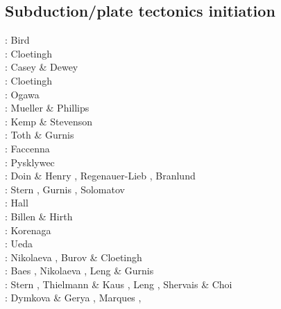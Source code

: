 \subsection{Subduction/plate tectonics initiation}

\begin{scriptsize}
\nineteenseventyeight: Bird \cite{bird78}\\
\nineteeneightytwo: Cloetingh \cite{clwv82}\\
\nineteeneightyfour: Casey \& Dewey \cite{cade84}\\
\nineteeneightynine: Cloetingh \etal \cite{clwv89}\\
\nineteenninety: Ogawa \cite{ogaw90} \\
\nineteenninetyone: Mueller \& Phillips \cite{muph91}\\
\nineteenninetysix: Kemp \& Stevenson \cite{kest96}\\
\nineteenninetyeight: Toth \& Gurnis \cite{togu98}\\
\nineteenninetynine: Faccenna \etal \cite{fagd99}\\
\twothousand: Pysklywec \etal \cite{pybf00}\\
\twothousandone: Doin \& Henry \cite{dohe01}, Regenauer-Lieb \etal \cite{reyb01},
                 Branlund \etal \cite{brry01}\\
\twothousandfour: Stern \cite{ster04}, Gurnis \etal \cite{guhl04}, 
                  Solomatov \cite{solo04}\\
\twothousandthree: Hall \etal \cite{hags03}\\
\twothousandfive: Billen \& Hirth \cite{bihi05}\\
\twothousandseven: Korenaga \cite{kore07}\\
\twothousandeight: Ueda \etal \cite{uegs08}\\
\twothousandten: Nikolaeva \etal \cite{nigm10}, Burov \& Cloetingh \cite{bucl10}\\
\twothousandeleven: Baes \etal \cite{bagw11}, Nikolaeva \etal \cite{nigm11}, 
                    Leng \& Gurnis \cite{legu11}\\
\twothousandtwelve: Stern \etal \cite{stri12}, Thielmann \& Kaus \cite{thka12},
                    Leng \etal \cite{lega12}, Shervais \& Choi \cite{shch12}\\
\twothousandthirteen: Dymkova \& Gerya \cite{dyge13}, Marques \etal \cite{mana13},

\end{scriptsize}
